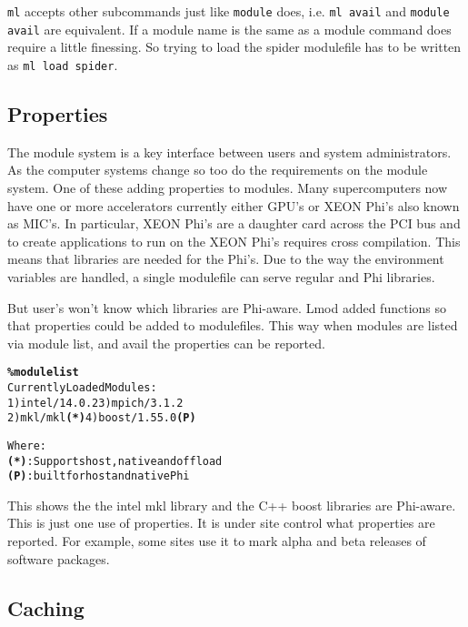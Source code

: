 \texttt{ml} accepts other subcommands just like \texttt{module} does,
i.e. \texttt{ml avail} and \texttt{module avail} are equivalent.  If a
module name is the same as a module command does require a little
finessing.  So trying to load the spider modulefile has to be written
as \texttt{ml load spider}.


\subsection{Properties}

The module system is a key interface between users and system
administrators.
As the computer systems change so too do the requirements on the module
system.  One of these adding properties to modules.  Many
supercomputers now have one or more accelerators currently either GPU's
or XEON Phi's also known as MIC's.   In particular, XEON Phi's are a
daughter card across the PCI bus and to create applications to run on
the XEON Phi's requires cross compilation.  This means that libraries
are needed for the Phi's.  Due to the way the environment variables
are handled, a single modulefile can serve regular and Phi libraries.

But user's won't know which libraries are Phi-aware.  Lmod added
functions so that properties could be added to modulefiles.  This way
when modules are listed via module list, and avail the properties can
be reported.
{\small
\begin{alltt}
  \textbf{\% module list}
  Currently Loaded Modules:
    1) intel/14.0.2       3) mpich/3.1.2
    2) mkl/mkl      \textbf{(*)}   4) boost/1.55.0 \textbf{(P)}

  Where:
   \textbf{(*)}:  Supports host, native and offload
   \textbf{(P)}:  built for host and native Phi
\end{alltt}
}
\noindent
This shows the the intel mkl library and the C++ boost libraries are Phi-aware.
This is just one use of properties.  It is under site
control what properties are reported.  For example, some sites use it
to mark alpha and beta releases of software packages.

\subsection{Caching}

